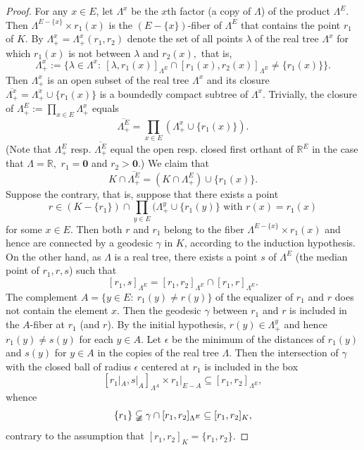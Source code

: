 \documentclass[10pt,a4paper]{amsart}
\begin{document}
\begin{proof}
For any $x\in E$, let $\Lambda^x$ be the $x$th factor (a copy of $\Lambda$) of the product ${\Lambda}^E$. Then $\Lambda^{E- \{ x\}}\times r_1(x)$ is the
$(E- \{ x\})$-fiber of $\Lambda^E$ that contains the point $r_1$ of $K$. By $\Lambda^x_+=\Lambda^x_+(r_1,r_2)$  denote the set of all
points $\lambda$ of the real tree
$\Lambda^x$ for which $r_1(x)$ is not between $\lambda$ and $r_2(x),$ that is,
$$\Lambda^x_+:=\{ \lambda\in \Lambda^x: ~ [\lambda,r_1(x)]_{\Lambda^E}\cap [r_1(x),r_2(x)]_{\Lambda^E}\ne \{ r_1(x)\}\}.$$
Then $\Lambda^x_+$ is an open subset of the real tree $\Lambda^x$ and its closure $\overline{\Lambda^x_+}=\Lambda^x_+\cup\{ r_1(x)\}$ is a boundedly
compact subtree of $\Lambda^x$. Trivially, the closure of $\Lambda^{E}_+:=\prod_{x\in E}\Lambda^x_+$ equals
$$\overline{\Lambda^E_+}=\prod_{x\in E} (\Lambda_+^x\cup \{ r_1(x)\}).$$
(Note that $\Lambda^E_+$ resp. $\overline{\Lambda^E_+}$ equal the open resp. closed first orthant of ${\mathbb R}^E$ in the case that $\Lambda={\mathbb R},$
$r_1={\mathbf 0}$ and $r_2>{\mathbf 0}$.)  We claim that
$${K}\cap \overline{\Lambda^{E}_+}=({K}\cap \Lambda^{E}_+)\cup \{ r_1(x)\}.$$
Suppose the contrary, that is, suppose that there exists a point $$r\in ({K}- \{ r_1\})\cap \prod_{y\in E}(\Lambda^y_+\cup \{ r_1(y)\} \mbox{ with } r(x)=r_1(x)$$
for some $x\in E$. Then both $r$ and $r_1$ belong to the fiber $\Lambda^{E- \{ x\}}\times r_1(x)$ and hence are connected by a geodesic $\gamma$ in $K$, according to the induction hypothesis. On the other hand, as $\Lambda$ is a real tree, there exists a point $s$ of $\Lambda^E$ (the median point of $r_1,r,s$) such that
$$[r_1,s]_{\Lambda^E}=[r_1,r_2]_{\Lambda^E}\cap [r_1,r]_{\Lambda^E}.$$
The complement $A=\{ y\in E: ~ r_1(y)\ne r(y)\}$ of the equalizer of $r_1$ and $r$ does not contain the element $x$. Then the geodesic $\gamma$ between $r_1$
and $r$ is included in the $A$-fiber at $r_1$ (and $r$). By the initial hypothesis, $r(y)\in \Lambda^y_+$ and hence $r_1(y)\ne s(y)$ for each $y\in A$. Let
$\epsilon$ be the minimum of the distances of $r_1(y)$ and $s(y)$ for $y\in A$ in the copies of the real tree $\Lambda$. Then the intersection of $\gamma$
with the closed ball of radius $\epsilon$ centered at $r_1$ is included in the box
$$[r_1|_{A},s|_{A}]_{\Lambda^{A}}\times r_1|_{E- A}\subseteq [r_1,r_2]_{\Lambda^E},$$
whence
$$\{ r_1\}\varsubsetneqq\gamma\cap [r_1,r_2]_{\Lambda^E}\subseteq [r_1,r_2]_{K},$$
contrary to the assumption that $[r_1,r_2]_{K}=\{ r_1,r_2\}.$


\end{proof}
\end{document}
